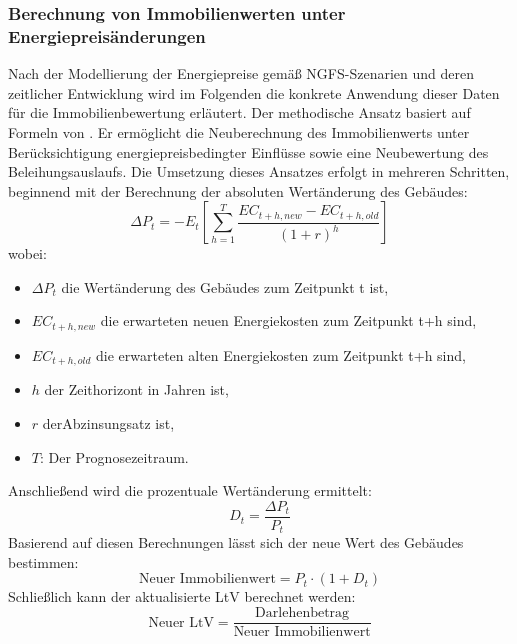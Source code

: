 \subsubsection{Berechnung von Immobilienwerten unter Energiepreisänderungen}
Nach der Modellierung der Energiepreise gemäß NGFS-Szenarien und deren zeitlicher Entwicklung wird im Folgenden die konkrete Anwendung dieser Daten für die Immobilienbewertung erläutert. Der methodische Ansatz basiert auf Formeln von \parencite{tergerman}. Er ermöglicht die Neuberechnung des Immobilienwerts unter Berücksichtigung energiepreisbedingter Einflüsse sowie eine Neubewertung des Beleihungsauslaufs. Die Umsetzung dieses Ansatzes erfolgt in mehreren Schritten, beginnend mit der Berechnung der absoluten Wertänderung des Gebäudes:
\begin{equation}
\Delta P_t = -E_t\left[ \sum_{h=1}^T \frac{EC_{t+h,new} - EC_{t+h,old}}{(1+r)^h} \right]
\end{equation}
wobei:
\begin{itemize}
\item $\Delta P_t$ die Wertänderung des Gebäudes zum Zeitpunkt t ist,
\item $EC_{t+h,new}$ die erwarteten neuen Energiekosten zum Zeitpunkt t+h sind,
\item $EC_{t+h,old}$ die erwarteten alten Energiekosten zum Zeitpunkt t+h sind,
\item $h$ der Zeithorizont in Jahren ist,
\item $r$ derAbzinsungsatz ist,
\item $T$: Der Prognosezeitraum.
\end{itemize}
Anschließend wird die prozentuale Wertänderung ermittelt:
\begin{equation}
D_t = \frac{\Delta P_t}{P_t} 
\end{equation}
Basierend auf diesen Berechnungen lässt sich der neue Wert des Gebäudes bestimmen:
\begin{equation}
\text{Neuer Immobilienwert} = P_t \cdot (1 + D_t)
\end{equation}
Schließlich kann der aktualisierte \ac{LtV} berechnet werden:
\begin{equation}
\text{Neuer LtV} = \frac{\text{Darlehenbetrag}}{\text{Neuer Immobilienwert}}
\end{equation}